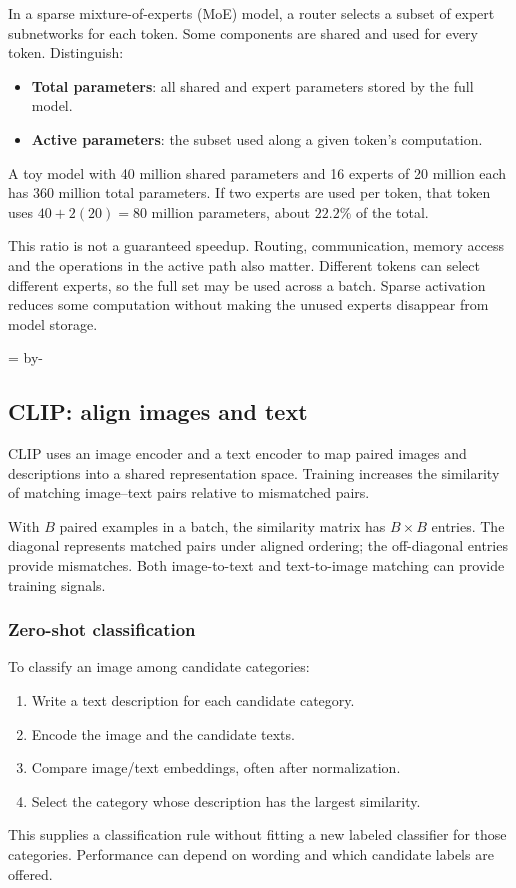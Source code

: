 \documentclass[11pt]{article}
\newcommand{\newsubsection}[1]{\par\begingroup\skip0=\pagegoal\advance\skip0 by-\pagetotal\ifdim\skip0<12\baselineskip\newpage\fi\endgroup\subsection{#1}}
\begin{document}
In a sparse mixture-of-experts (MoE) model, a router selects a subset of expert subnetworks for each token. Some components are shared and used for every token. Distinguish:
\begin{itemize}
\item \textbf{Total parameters}: all shared and expert parameters stored by the full model.
\item \textbf{Active parameters}: the subset used along a given token's computation.
\end{itemize}
A toy model with 40 million shared parameters and 16 experts of 20 million each has 360 million total parameters. If two experts are used per token, that token uses $40+2(20)=80$ million parameters, about $22.2\%$ of the total.

This ratio is not a guaranteed speedup. Routing, communication, memory access and the operations in the active path also matter. Different tokens can select different experts, so the full set may be used across a batch. Sparse activation reduces some computation without making the unused experts disappear from model storage.

\newsubsection{CLIP: align images and text}
CLIP uses an image encoder and a text encoder to map paired images and descriptions into a shared representation space. Training increases the similarity of matching image--text pairs relative to mismatched pairs.

With $B$ paired examples in a batch, the similarity matrix has $B\times B$ entries. The diagonal represents matched pairs under aligned ordering; the off-diagonal entries provide mismatches. Both image-to-text and text-to-image matching can provide training signals.

\subsubsection{Zero-shot classification}
To classify an image among candidate categories:
\begin{enumerate}
\item Write a text description for each candidate category.
\item Encode the image and the candidate texts.
\item Compare image/text embeddings, often after normalization.
\item Select the category whose description has the largest similarity.
\end{enumerate}
This supplies a classification rule without fitting a new labeled classifier for those categories. Performance can depend on wording and which candidate labels are offered.
\end{document}

